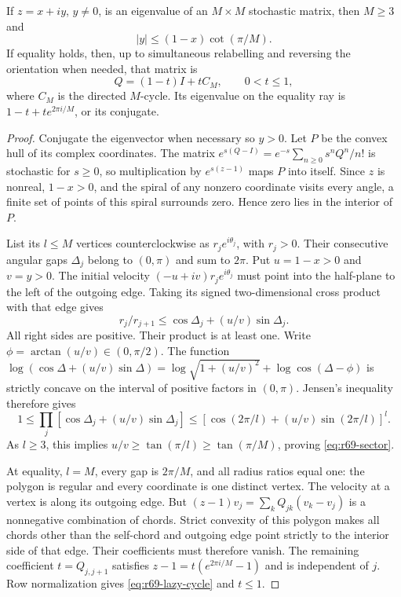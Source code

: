 \begin{lemma}\label{lem:r69-sector}
If $z=x+iy$, $y\ne0$, is an eigenvalue of an $M\times M$ stochastic matrix, then $M\ge3$ and
\begin{equation}\label{eq:r69-sector}
 |y|\le(1-x)\cot(\pi/M).
\end{equation}
If equality holds, then, up to simultaneous relabelling and reversing the orientation when needed, that matrix is
\begin{equation}\label{eq:r69-lazy-cycle}
 Q=(1-t)I+tC_M,\qquad 0<t\le1,
\end{equation}
where $C_M$ is the directed $M$-cycle. Its eigenvalue on the equality ray is $1-t+te^{2\pi i/M}$, or its conjugate.
\end{lemma}
\begin{proof}
Conjugate the eigenvector when necessary so $y>0$. Let $P$ be the convex hull of its complex coordinates. The matrix
$e^{s(Q-I)}=e^{-s}\sum_{n\ge0}s^nQ^n/n!$ is stochastic for $s\ge0$, so multiplication by $e^{s(z-1)}$ maps $P$ into itself. Since $z$ is nonreal, $1-x>0$, and the spiral of any nonzero coordinate visits every angle, a finite set of points of this spiral surrounds zero. Hence zero lies in the interior of $P$.

List its $l\le M$ vertices counterclockwise as $r_je^{i\theta_j}$, with $r_j>0$. Their consecutive angular gaps $\Delta_j$ belong to $(0,\pi)$ and sum to $2\pi$. Put $u=1-x>0$ and $v=y>0$. The initial velocity $(-u+iv)r_je^{i\theta_j}$ must point into the half-plane to the left of the outgoing edge. Taking its signed two-dimensional cross product with that edge gives
\[
 r_j/r_{j+1}\le \cos\Delta_j+(u/v)\sin\Delta_j.
\]
All right sides are positive. Their product is at least one. Write $\phi=\arctan(u/v)\in(0,\pi/2)$. The function
$\log(\cos\Delta+(u/v)\sin\Delta)
 =\log\sqrt{1+(u/v)^2}+\log\cos(\Delta-\phi)$
is strictly concave on the interval of positive factors in $(0,\pi)$. Jensen's inequality therefore gives
\[
 1\le\prod_j[\cos\Delta_j+(u/v)\sin\Delta_j]
 \le[\cos(2\pi/l)+(u/v)\sin(2\pi/l)]^l.
\]
As $l\ge3$, this implies $u/v\ge\tan(\pi/l)\ge\tan(\pi/M)$, proving \eqref{eq:r69-sector}.

At equality, $l=M$, every gap is $2\pi/M$, and all radius ratios equal one: the polygon is regular and every coordinate is one distinct vertex. The velocity at a vertex is along its outgoing edge. But
$(z-1)v_j=\sum_kQ_{jk}(v_k-v_j)$ is a nonnegative combination of chords. Strict convexity of this polygon makes all chords other than the self-chord and outgoing edge point strictly to the interior side of that edge. Their coefficients must therefore vanish. The remaining coefficient $t=Q_{j,j+1}$ satisfies $z-1=t(e^{2\pi i/M}-1)$ and is independent of $j$. Row normalization gives \eqref{eq:r69-lazy-cycle} and $t\le1$.
\end{proof}

